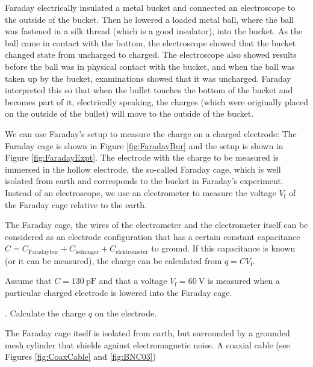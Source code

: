 \documentclass[../Elmag-labhefte-2022.tex]{subfiles}
\begin{document}
Faraday electrically insulated a metal bucket and connected an electroscope to the outside of the bucket. Then he lowered a loaded metal ball, where the ball was fastened in a silk thread (which is a good insulator), into the bucket. As the ball came in contact with the bottom, the electroscope showed that the bucket changed state from uncharged to charged. The electroscope also showed results before the ball was in physical contact with the bucket, and when the ball was taken up by the bucket, examinations showed that it was uncharged. Faraday interpreted this so that when the bullet touches the bottom of the bucket and becomes part of it, electrically speaking, the charges (which were originally placed on the outside of the bullet) will move to the outside of the bucket.

We can use Faraday's setup to measure the charge on a charged electrode: The Faraday cage is shown in Figure \ref{fig:FaradayBur} and the setup is shown in Figure \ref{fig:FaradayExpt}. The electrode with the charge to be measured is immersed in the hollow electrode, the so-called Faraday cage, which is well isolated from earth and corresponds to the bucket in Faraday's experiment. Instead of an electroscope, we use an electrometer to measure the voltage $V_\text{f}$ of the Faraday cage relative to the earth.


The Faraday cage, the wires of the electrometer and the electrometer itself can be considered as an electrode configuration that has a certain constant capacitance $C = C_\text{Faradaybur} + C_\mathrm{ledninger} + C_\text{elektrometer}$ to ground. If this capacitance is known (or it can be measured), the charge can be calculated from $q = C V_\text{f}$.

Assume that $C = \SI{130}{\pico\farad}$ and that a voltage $V_\text{f} = \SI{60}{\volt}$ is measured when a particular charged electrode is lowered into the Faraday cage.

{. Calculate the charge $q$ on the electrode.}

The Faraday cage itself is isolated from earth, but surrounded by a grounded mesh cylinder that shields against electromagnetic noise. A coaxial cable (see Figures \ref{fig:CoaxCable} and \ref{fig:BNC03})
\end{document}
